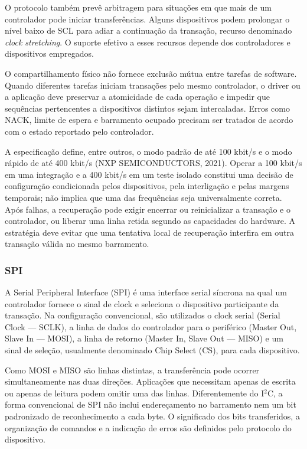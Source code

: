 \documentclass{article}
\begin{document}
O protocolo tamb\'em prev\^e arbitragem para situa\c{c}\~oes em que mais de um controlador pode iniciar transfer\^encias. Alguns dispositivos podem prolongar o n\'ivel baixo de SCL para adiar a continua\c{c}\~ao da transa\c{c}\~ao, recurso denominado \emph{clock stretching}. O suporte efetivo a esses recursos depende dos controladores e dispositivos empregados.


O compartilhamento f\'isico n\~ao fornece exclus\~ao m\'utua entre tarefas de software. Quando diferentes tarefas iniciam transa\c{c}\~oes pelo mesmo controlador, o driver ou a aplica\c{c}\~ao deve preservar a atomicidade de cada opera\c{c}\~ao e impedir que sequ\^encias pertencentes a dispositivos distintos sejam intercaladas. Erros como NACK, limite de espera e barramento ocupado precisam ser tratados de acordo com o estado reportado pelo controlador.


A especifica\c{c}\~ao define, entre outros, o modo padr\~ao de at\'e 100 kbit/s e o modo r\'apido de at\'e 400 kbit/s (NXP SEMICONDUCTORS, 2021). Operar a 100 kbit/s em uma integra\c{c}\~ao e a 400 kbit/s em um teste isolado constitui uma decis\~ao de configura\c{c}\~ao condicionada pelos dispositivos, pela interliga\c{c}\~ao e pelas margens temporais; n\~ao implica que uma das frequ\^encias seja universalmente correta. Ap\'os falhas, a recupera\c{c}\~ao pode exigir encerrar ou reinicializar a transa\c{c}\~ao e o controlador, ou liberar uma linha retida segundo as capacidades do hardware. A estrat\'egia deve evitar que uma tentativa local de recupera\c{c}\~ao interfira em outra transa\c{c}\~ao v\'alida no mesmo barramento.


\subsubsection{SPI}


A Serial Peripheral Interface (SPI) \'e uma interface serial s\'incrona na qual um controlador fornece o sinal de clock e seleciona o dispositivo participante da transa\c{c}\~ao. Na configura\c{c}\~ao convencional, s\~ao utilizados o clock serial (Serial Clock --- SCLK), a linha de dados do controlador para o perif\'erico (Master Out, Slave In --- MOSI), a linha de retorno (Master In, Slave Out --- MISO) e um sinal de sele\c{c}\~ao, usualmente denominado Chip Select (CS), para cada dispositivo.


Como MOSI e MISO s\~ao linhas distintas, a transfer\^encia pode ocorrer simultaneamente nas duas dire\c{c}\~oes. Aplica\c{c}\~oes que necessitam apenas de escrita ou apenas de leitura podem omitir uma das linhas. Diferentemente do I$^2$C, a forma convencional de SPI n\~ao inclui endere\c{c}amento no barramento nem um bit padronizado de reconhecimento a cada byte. O significado dos bits transferidos, a organiza\c{c}\~ao de comandos e a indica\c{c}\~ao de erros s\~ao definidos pelo protocolo do dispositivo.
\end{document}
